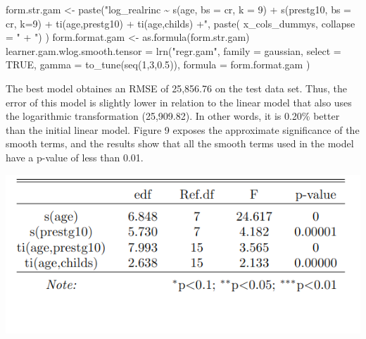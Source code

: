 \documentclass[11pt,a4paper]{article}
\let\origfigure\figure
\let\endorigfigure\endfigure
\renewenvironment{figure}[1][2] {
    \expandafter\origfigure\expandafter[H]
} {
    \endorigfigure
}
\newenvironment{Shaded}{\begin{snugshade}}{\end{snugshade}}
\newcommand{\AttributeTok}[1]{\textcolor[rgb]{0.77,0.63,0.00}{#1}}
\newcommand{\ConstantTok}[1]{\textcolor[rgb]{0.00,0.00,0.00}{#1}}
\newcommand{\DecValTok}[1]{\textcolor[rgb]{0.00,0.00,0.81}{#1}}
\newcommand{\FloatTok}[1]{\textcolor[rgb]{0.00,0.00,0.81}{#1}}
\newcommand{\FunctionTok}[1]{\textcolor[rgb]{0.00,0.00,0.00}{#1}}
\newcommand{\NormalTok}[1]{#1}
\newcommand{\OtherTok}[1]{\textcolor[rgb]{0.56,0.35,0.01}{#1}}
\newcommand{\StringTok}[1]{\textcolor[rgb]{0.31,0.60,0.02}{#1}}
\begin{document}
\begin{Shaded}
\begin{Highlighting}[]
\NormalTok{form.str.gam }\OtherTok{\textless{}{-}} \FunctionTok{paste}\NormalTok{(}\StringTok{"log\_realrinc \textasciitilde{} s(age, bs = \textquotesingle{}cr\textquotesingle{}, k = 9) }
\StringTok{                                    + s(prestg10, bs = \textquotesingle{}cr\textquotesingle{}, k=9) + }
\StringTok{                        ti(age,prestg10) + ti(age,childs) +"}\NormalTok{,}
                       \FunctionTok{paste}\NormalTok{( x\_cols\_dummys, }\AttributeTok{collapse =} \StringTok{" + "}\NormalTok{) )}
\NormalTok{form.format.gam }\OtherTok{\textless{}{-}} \FunctionTok{as.formula}\NormalTok{(form.str.gam)}
\NormalTok{learner.gam.wlog.smooth.tensor }\OtherTok{=} \FunctionTok{lrn}\NormalTok{(}\StringTok{"regr.gam"}\NormalTok{,}
                                     \AttributeTok{family =} \StringTok{\textquotesingle{}gaussian\textquotesingle{}}\NormalTok{,}
                                     \AttributeTok{select =} \ConstantTok{TRUE}\NormalTok{,}
                                     \AttributeTok{gamma =} \FunctionTok{to\_tune}\NormalTok{(}\FunctionTok{seq}\NormalTok{(}\DecValTok{1}\NormalTok{,}\DecValTok{3}\NormalTok{,}\FloatTok{0.5}\NormalTok{)),}
                                     \AttributeTok{formula =}\NormalTok{ form.format.gam}
\NormalTok{)}
\end{Highlighting}
\end{Shaded}

The best model obtaines an RMSE of 25,856.76 on the test data set. Thus,
the error of this model is slightly lower in relation to the linear
model that also uses the logarithmic transformation (25,909.82). In
other words, it is 0.20\% better than the initial linear model. Figure 9
exposes the approximate significance of the smooth terms, and the
results show that all the smooth terms used in the model have a p-value
of less than 0.01.

\begin{figure}
\includegraphics[width=0.8\linewidth]{includes/aprox_smooth} \caption{Approximate Significance of Smooth Terms}\label{fig:unnamed-chunk-3}
\end{figure}
\end{document}
